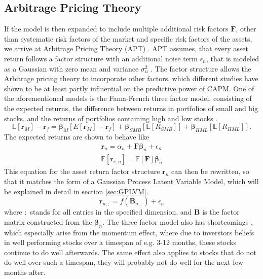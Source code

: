 \subsection{Arbitrage Pricing Theory}
\label{sec:apt}
If the model is then expanded to include multiple additional risk factors $\bm{F}$, other than systematic risk factors of the market and specific risk factors of the assets, we arrive at Arbitrage Pricing Theory (APT) \cite{Ross_2013}.
APT assumes, that every asset return follows a factor structure with an additional noise term $\epsilon_n$, that is modeled as a Gaussian with zero mean and variance $\sigma_n^2$ \cite{Ross_n_Roll_1995}. The factor structure allows the Arbitrage pricing theory to incorporate other factors, which different studies have shown to be at least partly influential on the predictive power of CAPM. One of the aforementioned models is the Fama-French three factor model, consisting of the expected returns, the difference between returns in portfolios of small and big stocks, and the returns of portfolios containing high and low stocks \cite{Fama_1993} \cite{Fama_1996}.
\begin{equation}%
	\mathbb{E}[\bm{r}_{M}] - \bm{r}_{f} = \bm{\beta}_{M}[{E}[\bm{r}_{M}] - \bm{r}_{f}] + \bm{\beta}_{SMB}[\mathbb{E}[R_{SMB}]] + \bm{\beta}_{HML}[\mathbb{E}[R_{HML}]].
\label{eq: Three factor model}
\end{equation}
The expected returns are shown to behave like 
\begin{subequations}%
	\label{eq:Arbitrage Pricing Model}
	\begin{align}
	\bm{r}_n = \alpha_n + \bm{F}\bm{\beta}_n + \epsilon_n         \label{eq:asset return factor structure} \\
	\mathbb{E}[\bm{r}_{e,n}] = \mathbb{E}[\bm{F}]\bm{\beta}_n         \label{eq:expected excess returns}
	\end{align}
\end{subequations} 
This equation for the asset return factor structure $\bm{r}_{n}$ can then be rewritten, so that it matches the form of a Gaussian Process Latent Variable Model, which will be explained in detail in section \ref{sec:GPLVM}. 
\begin{equation}%
	\bm{r}_{n,:} = f(\bm{B}_{n,:}) + \epsilon_n
\label{eq: GPLVM form of Arbitrage Pricing Theory}
\end{equation}
where $:$ stands for all entries in the specified dimension, and $\bm{B}$ is the factor matrix constructed from the $\bm{\beta}_n$. The three factor model also has shortcomings \cite{Fama_French_2004}, which especially arise from the momentum effect, where due to inverstors beliefs in well performing stocks over a timespan of e.g. 3-12 months, these stocks continue to do well afterwards. The same effect also applies to stocks that do not do well over such a timespan, they will probably not do well for the next few months after. \newline
